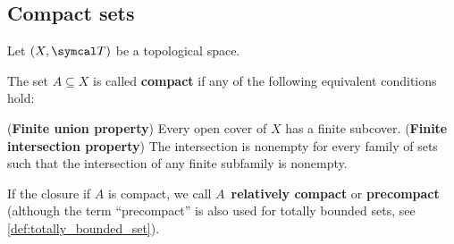 \subsection{Compact sets}\label{subsec:compact_sets}

Let \( (X, \Cal{T}) \) be a topological space.

\begin{definition}\label{def:compact_set}\cite[40]{Deimling1985}
  The set \( A \subseteq X \) is called \textbf{compact} if any of the following equivalent conditions hold:
  \begin{defenum}
     (\textbf{Finite union property}) Every open cover of \( X \) has a finite subcover.
     (\textbf{Finite intersection property}) The intersection is nonempty for every family of sets such that the intersection of any finite subfamily is nonempty.
  \end{defenum}

  If the closure if \( A \) is compact, we call \( A \)~\textbf{relatively compact} or \textbf{precompact} (although the term \enquote{precompact} is also used for totally bounded sets, see \ref{def:totally_bounded_set}).
\end{definition}
